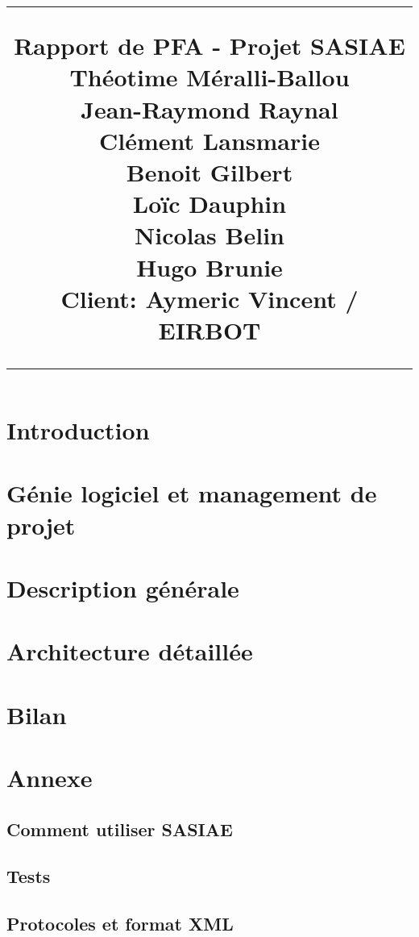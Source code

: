 \documentclass{scrreprt}
\title{
\flushright
\rule{16cm}{5pt}
\vskip1cm
{\Huge Rapport de PFA - Projet SASIAE}\\
\vspace{9cm}
{\small Théotime Méralli-Ballou\\ Jean-Raymond Raynal\\ Clément Lansmarie\\ Benoit Gilbert\\ Loïc Dauphin\\ Nicolas Belin\\ Hugo Brunie\\ }
\vfill
{\small Client: Aymeric Vincent / EIRBOT }
\rule{16cm}{5pt}
}
\date{}
\begin{document}
\maketitle
\tableofcontents

\chapter{Introduction}


\chapter{Génie logiciel et management de projet}


\chapter{Description générale}


\chapter{Architecture détaillée}


\chapter{Bilan}


\chapter{Annexe}

\section{Comment utiliser SASIAE}


\newpage
\section{Tests}


\section{Protocoles et format XML}

\end{document}
